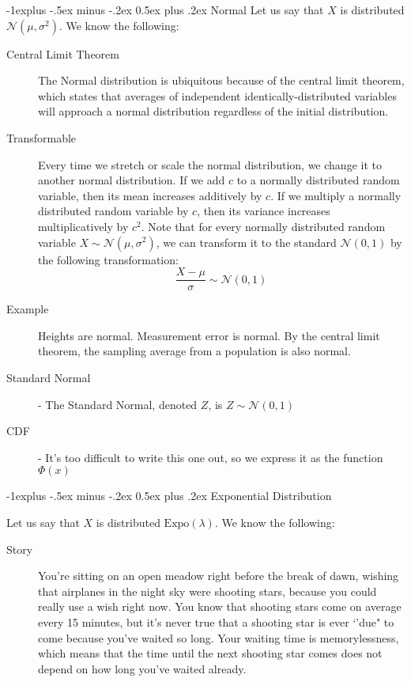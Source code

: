 \documentclass[10pt,landscape]{article}
\makeatletter
\theoremstyle{definition}
\newcommand{\N}{\mathcal{N}}
\newcommand{\Expo}{\textrm{Expo}}
\renewcommand{\subsection}{\@startsection{subsection}{2}{0mm}%
                                {-1explus -.5ex minus -.2ex}%
                                {0.5ex plus .2ex}%
                                {\normalfont\normalsize\bfseries}}
\makeatother
\begin{document}
\begin{multicols}{3}
\begin{description}
    
\end{description}

\subsection{Normal} Let us say that $X$ is distributed $\N(\mu, \sigma^2)$. We know the following:
\begin{description}
    \item[Central Limit Theorem] The Normal distribution is ubiquitous because of the central limit theorem, which states that averages of independent identically-distributed variables will approach a normal distribution regardless of the initial distribution.
    \item[Transformable] Every time we stretch or scale the normal distribution, we change it to another normal distribution. If we add $c$ to a normally distributed random variable, then its mean increases additively by $c$. If we multiply a normally distributed random variable by $c$, then its variance increases multiplicatively by $c^2$. Note that for every normally distributed random variable $X \sim \N(\mu, \sigma^2)$, we can transform it to the standard $\N(0, 1)$ by the following transformation:
    \[\frac{X - \mu}{\sigma} \sim \N(0, 1) \]
    \item[Example] Heights are normal. Measurement error is normal. By the central limit theorem, the sampling average from a population is also normal.
    \item[Standard Normal] - The Standard Normal, denoted $Z$, is $Z \sim \N(0, 1)$
    \item[CDF] - It's too difficult to write this one out, so we express it as the function $\Phi(x)$
\end{description}

\subsection{Exponential Distribution}

Let us say that $X$ is distributed $\Expo(\lambda)$. We know the following:
\begin{description}
    \item[Story] You're sitting on an open meadow right before the break of dawn, wishing that airplanes in the night sky were shooting stars, because you could really use a wish right now. You know that shooting stars come on average every 15 minutes, but it's never true that a shooting star is ever `'due" to come because you've waited so long. Your waiting time is memorylessness, which means that the time until the next shooting star comes does not depend on how long you've waited already.
    

\end{description}
\end{multicols}
\end{document}
